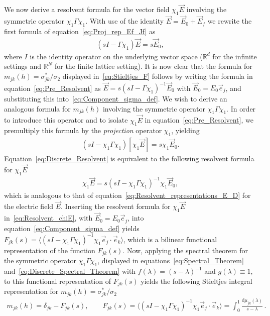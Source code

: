 \documentclass{cmslatex}
\renewcommand{\d}{\text{d}}
\begin{document}
We now derive a resolvent formula for the vector field
$\chi_1\vec{E}$ involving the symmetric operator $\chi_1\Gamma\chi_1$. With use of the
identity $\vec{E}=\vec{E}_0+\vec{E}_f$ we rewrite the first formula of
equation~\eqref{eq:Proj_rep_Ef_Jf} as  
%
\begin{align}\label{eq:Pre_Resolvent}
  (sI-\Gamma\chi_1)\vec{E}=s\vec{E}_0,
\end{align}
%
where $I$ is the identity operator on the underlying vector space
($\mathbb{R}^d$ for the infinite settings and $\mathbb{R}^N$ for the
finite lattice setting). It is now clear that the formula for
$m_{jk}(h)=\sigma^*_{jk}/\sigma_2$ displayed in~\eqref{eq:Stieltjes_F} follows by writing
the formula in equation~\eqref{eq:Pre_Resolvent} as
$\vec{E}=s(sI-\Gamma\chi_1)^{-1}\vec{E}_0$ with $\vec{E}_0=E_0\vec{e}_j$, and
substituting this into~\eqref{eq:Component_sigma_def}. We wish to derive an
analogous formula for $m_{jk}(h)$ involving the symmetric operator
$\chi_1\Gamma\chi_1$. In order to introduce this operator and to isolate
$\chi_1\vec{E}$ in equation~\eqref{eq:Pre_Resolvent}, we premultiply
this formula by the \emph{projection} operator $\chi_1$, yielding 
%
\begin{align}\label{eq:Discrete_Resolvent}
  (sI-\chi_1\Gamma\chi_1)[\chi_1\vec{E}]=s\chi_1\vec{E}_0.
\end{align}
%
Equation~\eqref{eq:Discrete_Resolvent} is equivalent to the following
resolvent formula for $\chi_1\vec{E}$
%
\begin{align}\label{eq:Resolvent_chiE}
  \chi_1\vec{E}=s(sI-\chi_1\Gamma\chi_1)^{-1}\chi_1\vec{E}_0,
\end{align}
%
which is analogous to that of
equation~\eqref{eq:Resolvent_representations_E_D} for the electric
field $\vec{E}$. Inserting the resolvent formula for $\chi_1\vec{E}$
in~\eqref{eq:Resolvent_chiE}, with $\vec{E}_0=E_0\vec{e}_j$, into 
equation~\eqref{eq:Component_sigma_def} yields
$F_{jk}(s)=\langle(sI-\chi_1\Gamma\chi_1)^{-1}\chi_1\vec{e}_j\cdot\vec{e}_k\rangle$, which is a
bilinear functional representation of the function
$F_{jk}(s)$. Now, applying the spectral theorem for the symmetric
operator $\chi_1\Gamma\chi_1$, displayed in equations~\eqref{eq:Spectral_Theorem}
and~\eqref{eq:Discrete_Spectral_Theorem} with $f(\lambda)=(s-\lambda)^{-1}$ and
$g(\lambda)\equiv1$, to this functional representation of $F_{jk}(s)$ yields the following
Stieltjes integral representation for $m_{jk}(h)=\sigma^*_{jk}/\sigma_2$ 
%
\begin{align}\label{eq:Stieltjes_m}
  m_{jk}(h)=\delta_{jk}-F_{jk}(s), \qquad
  F_{jk}(s)=\langle(sI-\chi_1\Gamma\chi_1)^{-1}\chi_1\vec{e}_j\cdot\vec{e}_k\rangle=\int_0^1\frac{\d\mu_{jk}(\lambda)}{s-\lambda}\,.
\end{align}
%
\end{document}
